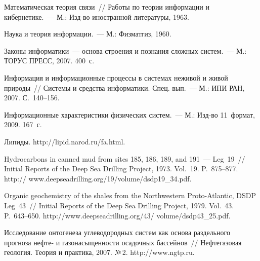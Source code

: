 \begin{multicols}{2}
{{\begin{thebibliography}{99}
Математическая теория связи~// Работы по теории информации и кибернетике.~--- 
М.: Изд-во иностранной литературы, 1963.


Наука и теория информации.~--- М.: Физматгиз, 1960.


Законы информатики~--- основа строения и познания сложных систем.~--- М.: 
ТОРУС ПРЕСС, 2007.  400~с.

Информация и информационные процессы в системах неживой и живой природы~// 
Системы и средства информатики. Спец. вып.~--- М.: ИПИ РАН, 2007. С.~140--156.

Информационные характеристики физических систем.~--- М.: Изд-во 11~формат, 2009. 167~с.


Липиды. {\sf http://lipid.narod.ru/fa.html}.


Hydrocarbons in canned mud from sites 185, 186, 189, and 191~--- Leg~19~//
Initial Reports of the Deep Sea Drilling Project, 1973. Vol.~19. P.~875--877. 
{\sf http:// www.deepseadrilling.org/19/volume/dsdp19\_34.pdf}. 

Organic geochemistry of the shales from the Northwestern Proto-Atlantic, DSDP Leg~43~//
Initial Reports of the Deep Sea Drilling Project, 1979. Vol.~43. P.~643--650. 
{\sf http://www.deepseadrilling.org/43/ volume/dsdp43\_25.pdf}.

\label{end\stat}

Исследование онтогенеза углеводородных систем как основа раздельного прогноза 
нефте- и газонасыщенности осадочных бассейнов~// Нефтегазовая геология. Теория 
и практика, 2007. №\,2. {\sf http://www.ngtp.ru}.




 \end{thebibliography}}}%
\end{multicols}
     